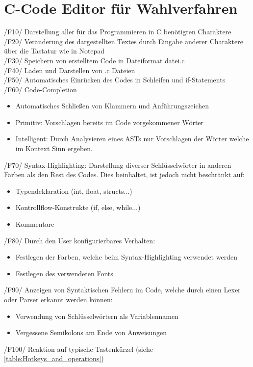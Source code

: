 \documentclass[a4paper]{scrreprt}
\begin{document}
\section{C-Code Editor für Wahlverfahren}
/F10/ Darstellung aller für das Programmieren in C benötigten Charaktere \\
/F20/ Veränderung des dargestellten Textes durch Eingabe anderer Charaktere über die Tastatur wie in Notepad \\
/F30/ Speichern von erstelltem Code in Dateiformat datei.c \\
/F40/ Laden und Darstellen von .c Dateien  \\
/F50/ Automatisches Einrücken des Codes in Schleifen und if-Statements \\
/F60/ Code-Completion
\begin{itemize}
\item Automatisches Schließen von Klammern und Anführungszeichen
\item Primitiv: Vorschlagen bereits im Code vorgekommener Wörter
\item Intelligent: Durch Analysieren eines ASTs nur Vorschlagen der Wörter welche im Kontext Sinn ergeben.
\end{itemize}
/F70/ Syntax-Highlighting: Darstellung diverser Schlüsselwörter in anderen Farben als den Rest des Codes. Dies beinhaltet, ist jedoch nicht beschränkt auf: 
\begin{itemize}
\item Typendeklaration (int, float, structs...)
\item Kontrollflow-Konstrukte (if, else, while...)
\item Kommentare
\end{itemize}
/F80/ Durch den User konfigurierbares Verhalten:
\begin{itemize}
\item Festlegen der Farben, welche beim Syntax-Highlighting verwendet werden
\item Festlegen des verwendeten Fonts
\end{itemize}
/F90/ Anzeigen von Syntaktischen Fehlern im Code, welche durch einen Lexer oder Parser erkannt werden können: 
\begin{itemize}
\item Verwendung von Schlüsselwörtern als Variablennamen 
\item Vergessene Semikolons am Ende von Anweisungen
\end{itemize}
/F100/ Reaktion auf typische Tastenkürzel (siehe \ref{table:Hotkeys_and_operations})\\
\end{document}
